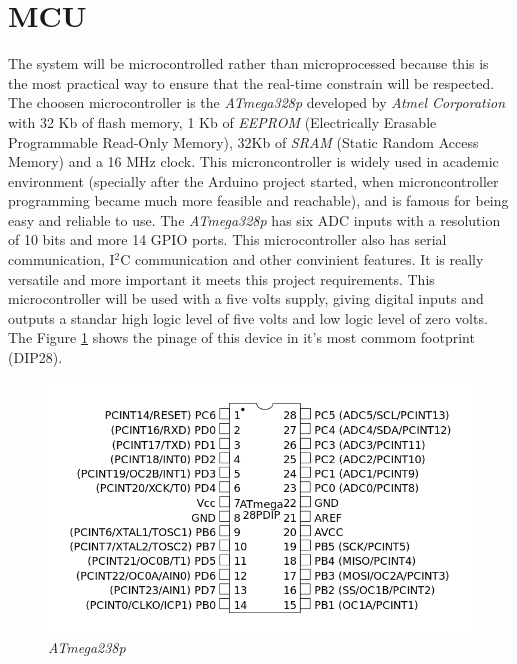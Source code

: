 \section{MCU}\label{sec:mcu}
		The system will be microcontrolled rather than microprocessed because this is the most practical way to ensure that the real-time constrain will be respected. The choosen microcontroller is the \textit{ATmega328p} developed by \textit{Atmel Corporation} with 32 Kb of flash memory, 1 Kb of \textit{EEPROM} (Electrically Erasable Programmable Read-Only Memory), 32Kb of \textit{SRAM} (Static Random Access Memory) and a 16 MHz clock. This microncontroller is widely used in academic environment (specially after the Arduino project started, when microncontroller programming became much more feasible and reachable), and is famous for being easy and reliable to use. The \textit{ATmega328p} has six ADC inputs with a resolution of 10 bits and more 14 GPIO ports. This microcontroller also has serial communication, I$^2$C communication and other convinient features. It is really versatile and more important it meets this project requirements. This microcontroller will be used with a five volts supply, giving digital inputs and outputs a standar high logic level of five volts and low logic level of zero volts. The Figure \ref{fig:atmega328p} shows the pinage of this device in it's most commom footprint (DIP28).

		\begin{figure}[htbp]
			\centering
			\includegraphics[scale=0.7]{figuras/fig-atmega328p.png}
			\caption{\textit{ATmega238p} \cite{coorporation2011atmel}}
			\label{fig:atmega328p}
		\end{figure}
	
